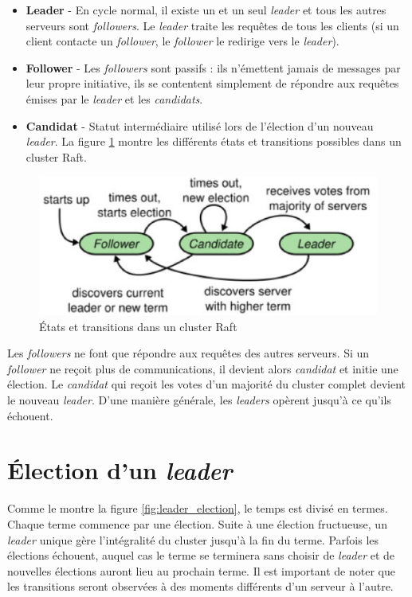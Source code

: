 \begin{itemize}
    \item \textbf{Leader} -
        En cycle normal, il existe un et un seul \emph{leader} et tous les autres
        serveurs sont \emph{followers}. Le \emph{leader} traite les requêtes de
        tous les clients (si un client contacte un \emph{follower}, le
        \emph{follower} le redirige vers le \emph{leader}).
    \item \textbf{Follower} -
        Les \emph{followers} sont passifs : ils n'émettent jamais de messages par
        leur propre initiative, ils se contentent simplement de répondre aux
        requêtes émises par le \emph{leader} et les \emph{candidats}.
    \item \textbf{Candidat} -
        Statut intermédiaire utilisé lors de l'élection d'un nouveau
        \emph{leader}. La figure \ref{fig:raft_server_states} montre les différents états
        et transitions possibles dans un cluster Raft.
\end{itemize}

\begin{figure}[H]
    \centerline{\includegraphics[width=.47\textwidth]{img/raft_server_states}}
    \caption{États et transitions dans un cluster Raft}
    \label{fig:raft_server_states}
\end{figure}

Les \emph{followers} ne font que répondre aux requêtes des autres serveurs. Si
un \emph{follower} ne reçoit plus de communications, il devient alors
\emph{candidat} et initie une élection. Le \emph{candidat} qui reçoit les votes
d'un majorité du cluster complet devient le nouveau \emph{leader}. D'une manière
générale, les \emph{leaders} opèrent jusqu'à ce qu'ils échouent.

\section{Élection d'un \emph{leader}}

Comme le montre la figure \ref{fig:leader_election}, le temps est divisé en
termes. Chaque terme commence par une élection. Suite à une élection fructueuse,
un \emph{leader} unique gère l'intégralité du cluster jusqu'à la fin du terme.
Parfois les élections échouent, auquel cas le terme se terminera sans choisir de
\emph{leader} et de nouvelles élections auront lieu au prochain terme. Il est
important de noter que les transitions seront observées à des moments différents
d'un serveur à l'autre.

